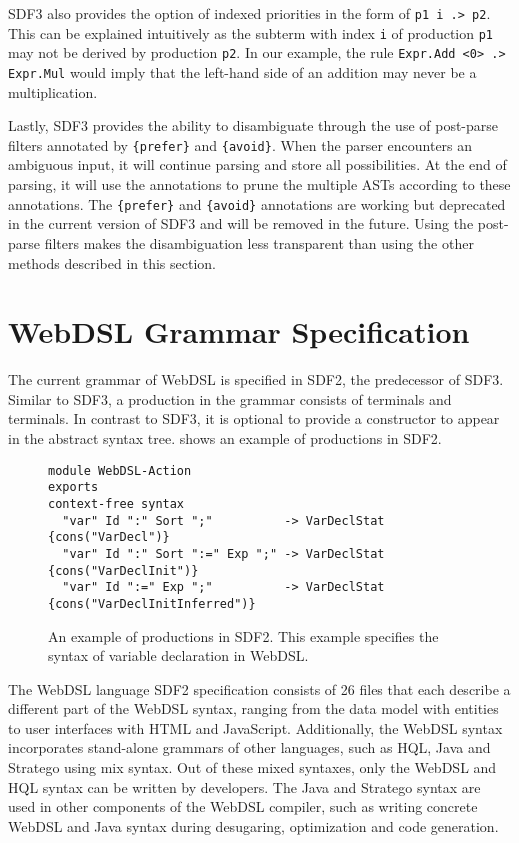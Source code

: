         SDF3 also provides the option of indexed priorities in the form of \texttt{p1 i .> p2}. This can be explained intuitively as the subterm with index \texttt{i} of production \texttt{p1} may not be derived by production \texttt{p2}. In our example, the rule \texttt{Expr.Add <0> .> Expr.Mul} would imply that the left-hand side of an addition may never be a multiplication.

        Lastly, SDF3 provides the ability to disambiguate through the use of post-parse filters annotated by \texttt{\{prefer\}} and \texttt{\{avoid\}}. When the parser encounters an ambiguous input, it will continue parsing and store all possibilities. At the end of parsing, it will use the annotations to prune the multiple ASTs according to these annotations. The \texttt{\{prefer\}} and \texttt{\{avoid\}} annotations are working but deprecated in the current version of SDF3 and will be removed in the future. Using the post-parse filters makes the disambiguation less transparent than using the other methods described in this section.

  \section{\label{sec:webdsl-grammar}WebDSL Grammar Specification}

    The current grammar of WebDSL is specified in SDF2, the predecessor of SDF3. Similar to SDF3, a production in the grammar consists of terminals and terminals. In contrast to SDF3, it is optional to provide a constructor to appear in the abstract syntax tree.  shows an example of productions in SDF2.

    \begin{figure}
      \begin{verbatim}
module WebDSL-Action
exports
context-free syntax
  "var" Id ":" Sort ";"          -> VarDeclStat {cons("VarDecl")}
  "var" Id ":" Sort ":=" Exp ";" -> VarDeclStat {cons("VarDeclInit")}
  "var" Id ":=" Exp ";"          -> VarDeclStat {cons("VarDeclInitInferred")}
      \end{verbatim}
      \caption{\label{fig:sdf2-example}An example of productions in SDF2. This example specifies the syntax of variable declaration in WebDSL.}
    \end{figure}

    The WebDSL language SDF2 specification consists of 26 files that each describe a different part of the WebDSL syntax, ranging from the data model with entities to user interfaces with HTML and JavaScript. Additionally, the WebDSL syntax incorporates stand-alone grammars of other languages, such as HQL, Java and Stratego using mix syntax. Out of these mixed syntaxes, only the WebDSL and HQL syntax can be written by developers. The Java and Stratego syntax are used in other components of the WebDSL compiler, such as writing concrete WebDSL and Java syntax during desugaring, optimization and code generation.

